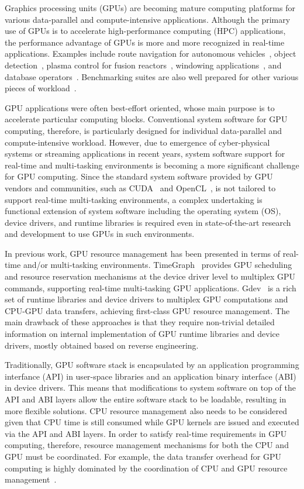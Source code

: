 Graphics processing units (GPUs) are becoming mature computing platforms
for various data-parallel and compute-intensive applications.
Although the primary use of GPUs is to accelerate high-performance
computing (HPC) applications, the performance advantage of GPUs is more
and more recognized in real-time applications.
Examples include route navigation for autonomous
vehicles~\cite{cmu:routing}, object
detection~\cite{hirabayashi:cpsna2013}, plasma control for fusion 
reactors~\cite{tokamak}, windowing applications~\cite{kato:rtas2011},
and database operators~\cite{bakkum:sql}.
Benchmarking suites are also well prepared for other various pieces of
workload~\cite{rodinia}.

GPU applications were often best-effort oriented, whose main purpose is
to accelerate particular computing blocks.
Conventional system software for GPU computing, therefore, is
particularly designed for individual data-parallel and compute-intensive
workload. 
However, due to emergence of cyber-physical systems or streaming
applications in recent years, system software support for real-time and
multi-tasking environments is becoming a more significant challenge for
GPU computing.
Since the standard system software provided by GPU vendors and
communities, such as CUDA~\cite{nvidia:cuda_zone} and
OpenCL~\cite{opencl}, is not tailored to support real-time multi-tasking
environments, a complex undertaking is functional extension of system
software including the operating system (OS), device drivers, and
runtime libraries is required even in state-of-the-art research and
development to use GPUs in such environments.

In previous work, GPU resource management has been presented in terms of
real-time and/or multi-tasking environments.
TimeGraph~\cite{kato:timegraph} provides GPU scheduling and resource
reservation mechanisms at the device driver level to multiplex GPU
commands, supporting real-time multi-tasking GPU applications.
Gdev~\cite{kato:gdev} is a rich set of runtime libraries and device
drivers to multiplex GPU computations and CPU-GPU data transfers,
achieving first-class GPU resource management.
The main drawback of these approaches is that they require non-trivial
detailed information on internal implementation of GPU runtime libraries
and device drivers, mostly obtained based on reverse engineering.

Traditionally, GPU software stack is encapsulated by an application
programming interfance (API) in user-space libraries and an application
binary interface (ABI) in device drivers.
This means that modifications to system software on top of the API and
ABI layers allow the entire software stack to be loadable, resulting in
more flexible solutions.
CPU resource management also needs to be considered given that CPU time
is still consumed while GPU kernels are issued and executed via the API
and ABI layers.
In order to satisfy real-time requirements in GPU computing, therefore,
resource management mechanisms for both the CPU and GPU must be
coordinated.
For example, the data transfer overhead for GPU computing is highly
dominated by the coordination of CPU and GPU resource
management~\cite{fujii:icpads2013}.

